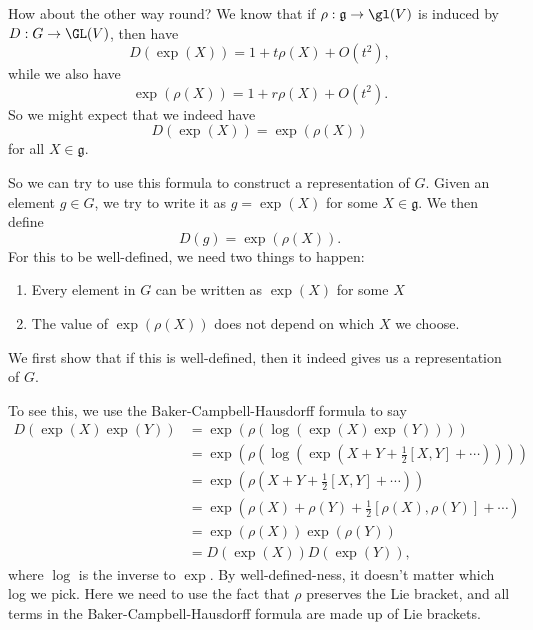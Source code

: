 \documentclass[a4paper]{article}
\begin{document}
How about the other way round? We know that if $\rho: \mathfrak{g} \to \gl(V)$ is induced by $D: G \to \GL(V)$, then have
\[
  D(\exp(X)) = 1 + t \rho(X) + O(t^2),
\]
while we also have
\[
  \exp(\rho(X)) = 1 + r \rho(X) + O(t^2).
\]
So we might expect that we indeed have
\[
  D(\exp(X)) = \exp(\rho(X))
\]
for all $X \in \mathfrak{g}$.

So we can try to use this formula to construct a representation of $G$. Given an element $g \in G$, we try to write it as $g = \exp(X)$ for some $X \in \mathfrak{g}$. We then define
\[
  D(g) = \exp(\rho(X)).
\]
For this to be well-defined, we need two things to happen:
\begin{enumerate}
  \item Every element in $G$ can be written as $\exp(X)$ for some $X$
  \item The value of $\exp(\rho(X))$ does not depend on which $X$ we choose.
\end{enumerate}
We first show that if this is well-defined, then it indeed gives us a representation of $G$.

To see this, we use the Baker-Campbell-Hausdorff formula to say
\begin{align*}
  D(\exp(X) \exp(Y)) &= \exp(\rho(\log(\exp(X)\exp(Y))))\\
  &= \exp\left(\rho\left(\log\left(\exp\left(X + Y + \frac{1}{2}[X, Y] + \cdots\right)\right)\right)\right)\\
  &= \exp\left(\rho\left(X + Y + \frac{1}{2}[X, Y] + \cdots\right)\right)\\
  &= \exp\left(\rho(X) + \rho(Y) + \frac{1}{2}[\rho(X), \rho(Y)] + \cdots\right)\\
  &= \exp(\rho(X))\exp(\rho(Y))\\
  &= D(\exp(X)) D(\exp(Y)),
\end{align*}
where $\log$ is the inverse to $\exp$. By well-defined-ness, it doesn't matter which log we pick. Here we need to use the fact that $\rho$ preserves the Lie bracket, and all terms in the Baker-Campbell-Hausdorff formula are made up of Lie brackets.
\end{document}
